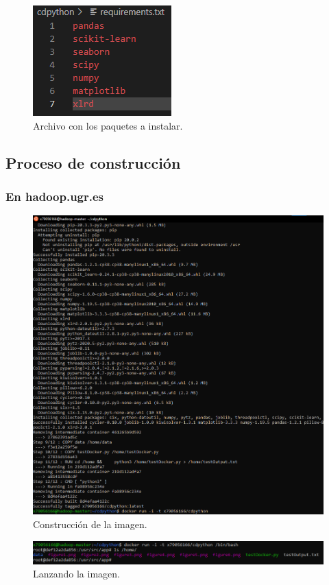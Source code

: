 \begin{figure}[H]\center\includegraphics[width=.25\linewidth]{img/python/p0-2.png}\caption{Archivo con los paquetes a instalar.}\end{figure}

\subsection{Proceso de construcción}

\subsubsection{En hadoop.ugr.es}

\begin{figure}[H]\center\includegraphics[width=.95\linewidth]{img/python/p1.png}\caption{Construcción de la imagen.}\end{figure}

\begin{figure}[H]\center\includegraphics[width=.95\linewidth]{img/python/p2.png}\caption{Lanzando la imagen.}\end{figure}

